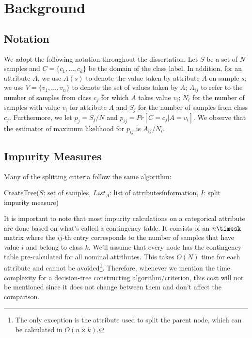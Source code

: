 \newpage

\chapter{Background}
\label{chap:background}

\section{Notation}
\label{sec:notation}
We adopt the following notation throughout the dissertation.
Let $S$ be a set of $N$ samples and 
 $C=\{c_1,\ldots,c_k\}$ be the domain of the class label. 
In addition, for an attribute  $A$, we use $A(s)$ to denote the value taken by attribute
$A$ on sample $s$; we use 
  $V=\{ v_1,\ldots,v_n \}$ to denote the set of values
taken by $A$;
$A_{ij}$ to refer to the  number of samples
from class $c_j$ for which  $A$ takes value $v_i$; 
 $N_i$ for the number of samples with value $v_i$ for attribute $A$
and $S_j$ for the number of samples from class $c_j$.
Furthermore, we let $p_j = S_j /N$ and $p_{ij}= Pr[C=c_j | A = v_i]$.
We observe that the estimator of maximum likelihood for $p_{ij} $ is
$A_{ij} / N_i$.  

\section{Impurity Measures}
Many of the splitting criteria follow the same algorithm:


\begin{algorithm}[tb]
   \caption{ CreateTree($S$: set of samples, $List_A$: list of attributes\' information, $I$: split impurity measure)}
   \label{alg:create-tree}
\begin{algorithmic}
\ENDFOR
{}
\end{algorithmic}
\end{algorithm}

It is important to note that most impurity calculations on a categorical attribute are done based on what's called a contingency table. It consists of an $n\timesk$ matrix where the $ij$-th entry corresponds to the number of samples that have value $i$ and belong to class $k$. We'll assume that every node has the contingency table pre-calculated for all nominal attributes. This takes $O(N)$ time for each attribute and cannot be avoided\footnote{The only exception is the attribute used to split the parent node, which can be calculated in $O(n\times k)$.}. Therefore, whenever we mention the time complexity for a decision-tree constructing algorithm/criterion, this cost will not be mentioned since it does not change between them and don't affect the comparison.

